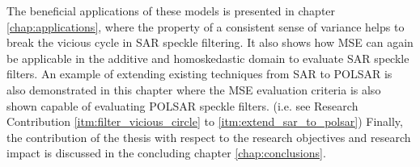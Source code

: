  The
                beneficial applications of these models is presented in
                chapter \ref{chap:applications}, where the property of a consistent sense of variance
                 helps to break the vicious cycle in SAR
                speckle filtering.
It
                also shows how MSE can again be applicable in the
                additive and homoskedastic domain to evaluate SAR
                speckle filters.
An
                example of extending existing techniques from SAR to
                POLSAR is also demonstrated in this chapter where the
                MSE evaluation criteria is also shown capable of
                evaluating POLSAR speckle filters.
(i.e. see Research Contribution \ref{itm:filter_vicious_circle} to \ref{itm:extend_sar_to_polsar})
Finally, the contribution of the thesis with respect to the research objectives and research impact is discussed in the concluding chapter \ref{chap:conclusions}.


%

